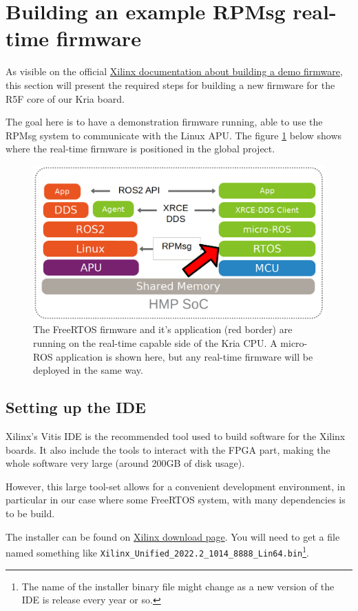 \documentclass[10pt]{article}
\begin{document}
\section{Building an example RPMsg real-time firmware}
\label{sec:org1d58743}
As visible on the official \href{https://xilinx-wiki.atlassian.net/wiki/spaces/A/pages/1837006921/OpenAMP+Base+Hardware+Configurations\\\#Build-RPU-firmware}{Xilinx documentation about building a demo firmware},
this section will present the required steps for building a new firmware for the R5F
core of our Kria board.

The goal here is to have a demonstration firmware running,
able to use the RPMsg system to communicate with the Linux APU.
The figure \ref{fig:org48be069} below shows where the real-time firmware
is positioned in the global project.

\begin{figure}[htbp]
\centering
\includegraphics[width=.6\textwidth]{./img/map_microros.png}
\caption{\label{fig:org48be069}The FreeRTOS firmware and it's application (red border) are running on the real-time capable side of the Kria CPU. A micro-ROS application is shown here, but any real-time firmware will be deployed in the same way.}
\end{figure}

\subsection{Setting up the IDE}
\label{sec:org29e0ff3}
Xilinx's Vitis IDE is the recommended tool used to build software for the Xilinx boards.
It also include the tools to interact with the FPGA part, making the whole
software very large (around 200GB of disk usage).

However, this large tool-set allows for a convenient development environment, in particular
in our case where some FreeRTOS system, with many dependencies is to be build.

The installer can be found on \href{https://www.xilinx.com/support/download/index.html/content/xilinx/en/downloadNav/vitis.html}{Xilinx download page}. You will need to get
a file named something like \texttt{Xilinx\_Unified\_2022.2\_1014\_8888\_Lin64.bin}\footnote{The name of the installer binary file might change as a new version of the IDE
is release every year or so.}.
\end{document}

